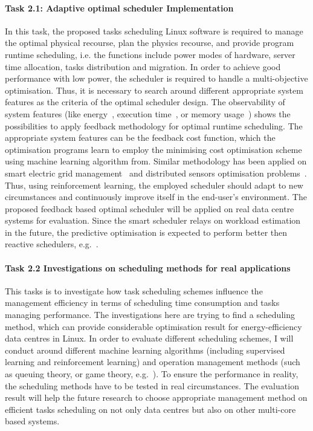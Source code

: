 \paragraph{Task 2.1: Adaptive optimal scheduler Implementation} In this task, the proposed tasks scheduling Linux software is required to manage the optimal physical recourse, plan the physics recourse, and provide program runtime scheduling, i.e. the functions include power modes of hardware, server time allocation, tasks distribution and migration. In order to achieve good performance with low power, the scheduler is required to handle a multi-objective optimisation. Thus, it is necessary to search around different appropriate system features as the criteria of the optimal scheduler design. The observability of system features (like energy~\cite{energy-aware}, execution time~\cite{multicore}, or memory usage~\cite{ma}) shows the possibilities to apply feedback methodology for optimal runtime scheduling. The appropriate system features can be the feedback cost function, which the optimisation programs learn to employ the minimising cost optimisation scheme using machine learning algorithm from. Similar methodology has been applied on smart electric grid management~\cite{powergrid} and distributed sensors optimisation problems~\cite{distributedsensors}. Thus, using reinforcement learning, the employed scheduler should adapt to new circumstances and continuously improve itself in the end-user's environment. The proposed feedback based optimal scheduler will be applied on real data centre systems for evaluation. Since the smart scheduler relays on workload estimation in the future, the predictive optimisation is expected to perform better then reactive schedulers, e.g.~\cite{energy-aware}.

\paragraph{Task 2.2 Investigations on scheduling methods for real applications} This tasks is to investigate how task scheduling schemes influence the management efficiency in terms of scheduling time consumption and tasks managing performance. The investigations here are trying to find a scheduling method, which can provide considerable optimisation result for energy-efficiency data centres in Linux. In order to evaluate different scheduling schemes, I will conduct around different machine learning algorithms (including supervised learning and reinforcement learning) and operation management methods (such as queuing theory, or game theory, e.g.~\cite{game}). To ensure the performance in reality, the scheduling methods have to be tested in real circumstances. The evaluation result will help the future research to choose appropriate management method on efficient tasks scheduling on not only data centres but also on other multi-core based systems.

